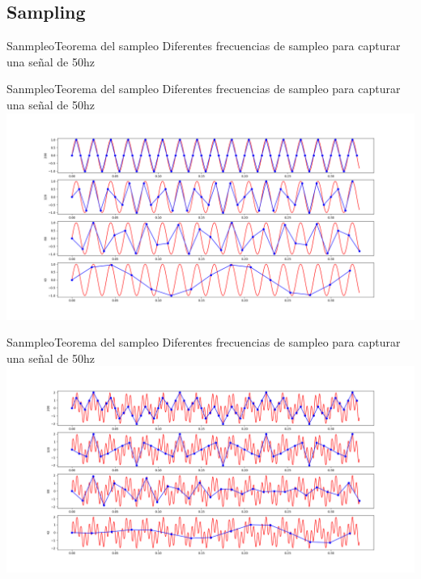 \documentclass{beamer}
\begin{document}
\begin{darkframes}
    \subsection{Sampling}
   \begin{frame}{Sanmpleo}{Teorema del sampleo}
      \handsonicon
      Diferentes frecuencias de sampleo para capturar una señal de 50hz
      
      \vfill
   \end{frame}

   \begin{frame}{Sanmpleo}{Teorema del sampleo}
      Diferentes frecuencias de sampleo para capturar una señal de 50hz
      \center\includegraphics[width=1.0\textwidth]{1_clase/teorema_sampleo}
      \vfill
   \end{frame}
   \begin{frame}{Sanmpleo}{Teorema del sampleo}
      Diferentes frecuencias de sampleo para capturar una señal de 50hz
      \center\includegraphics[width=1.0\textwidth]{1_clase/teorema_sampleo2}
      \vfill
   \end{frame}


\end{darkframes}
\end{document}
